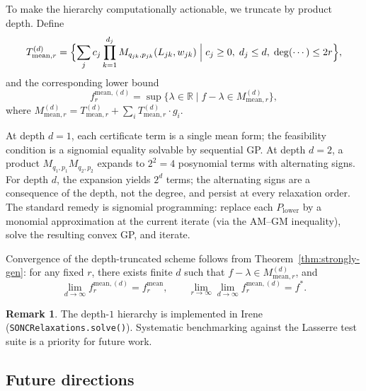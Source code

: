 \documentclass{amsart}
\theoremstyle{definition}
\newtheorem{rem}[thm]{Remark}
\numberwithin{equation}{section}
\newcommand{\reals}{\mathbb{R}}
\begin{document}
To make the hierarchy computationally actionable, we truncate by product
depth.  Define
\[
T_{\mathrm{mean},r}^{(d)}=\Bigl\{\sum_j c_j\prod_{k=1}^{d_j}
M_{q_{jk},p_{jk}}(L_{jk},w_{jk})
\;\Big|\;c_j\ge0,\;d_j\le d,\;\deg(\cdots)\le2r\Bigr\},
\]
and the corresponding lower bound
\[
f^{\mathrm{mean},(d)}_r
=\sup\{\lambda\in\reals\mid f-\lambda\in M_{\mathrm{mean},r}^{(d)}\},
\]
where $M_{\mathrm{mean},r}^{(d)}=T_{\mathrm{mean},r}^{(d)}+\sum_i T_{\mathrm{mean},r}^{(d)}\cdot g_i$.

At depth $d=1$, each certificate term is a single mean form; the feasibility
condition is a signomial equality solvable by sequential GP.  At depth
$d=2$, a product $M_{q_1,p_1}M_{q_2,p_2}$ expands to $2^2=4$ posynomial
terms with alternating signs.  For depth $d$, the expansion yields $2^d$
terms; the alternating signs are a consequence of the depth, not the degree,
and persist at every relaxation order.  The standard remedy is signomial
programming: replace each $P_{\mathrm{lower}}$ by a monomial approximation
at the current iterate (via the AM--GM inequality), solve the resulting
convex GP, and iterate.

Convergence of the depth-truncated scheme follows from
Theorem~\ref{thm:strongly-gen}: for any fixed $r$, there exists finite $d$
such that $f-\lambda\in M_{\mathrm{mean},r}^{(d)}$, and
\[
\lim_{d\to\infty}f^{\mathrm{mean},(d)}_r=f^{\mathrm{mean}}_r,
\qquad
\lim_{r\to\infty}\lim_{d\to\infty}f^{\mathrm{mean},(d)}_r=f^*.
\]

\begin{rem}
The depth-$1$ hierarchy is implemented in
Irene~\cite{GMIr} (\texttt{SONCRelaxations.solve()}).  Systematic
benchmarking against the Lasserre test suite is a priority for future work.
\end{rem}

\subsection{Future directions}
\end{document}
